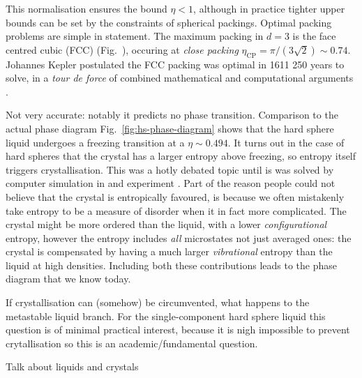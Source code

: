 \documentclass[11pt,twoside]{report}
\begin{document}
This normalisation ensures the bound $\eta < 1$, although in practice tighter upper bounds can be set by the constraints of spherical packings.
Optimal packing problems are simple in statement.
\cite{Cohn2016,Conway1999}
The maximum packing in $d = 3$ is the face centred cubic (FCC) (Fig.\ \cite{fig:fcc}), occuring at \emph{close packing} $\eta_\mathrm{CP} = \pi / (3\sqrt{2}) \sim 0.74$.
Johannes Kepler postulated the FCC packing was optimal in 1611 
250 years to solve, in a \emph{tour de force} of combined mathematical and computational arguments \cite{HalesAM2005}.

Not very accurate: notably it predicts no phase transition.
Comparison to the actual phase diagram Fig.\ \ref{fig:hs-phase-diagram} shows that the hard sphere liquid%
undergoes a freezing transition at a $\eta \sim 0.494$.
It turns out in the case of hard spheres that the crystal has a larger entropy above freezing, so entropy itself triggers crystallisation.
This was a hotly debated topic \cite{?,?,?} until is was solved by computer simulation in \cite{?,?,?} and experiment \cite{?,?,?}.
Part of the reason people could not believe that the crystal is entropically favoured, is because we often mistakenly take entropy to be a measure of disorder when it in fact more complicated.
The crystal might be more ordered than the liquid, with a lower \emph{configurational} entropy, however the entropy includes \emph{all} microstates not just averaged ones: the crystal is compensated by having a much larger \emph{vibrational} entropy than the liquid at high densities.
Including both these contributions leads to the phase diagram that we know today.

If crystallisation can (somehow) be circumvented, what happens to the metastable liquid branch.
For the single-component hard sphere liquid this question is of minimal practical interest, because it is nigh impossible to prevent crytallisation so this is an academic/fundamental question.

Talk about liquids and crystals
\end{document}
